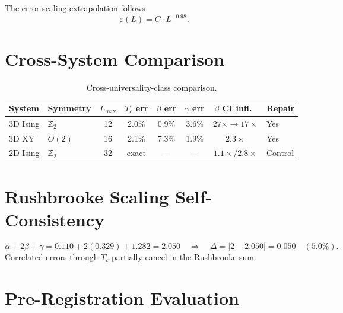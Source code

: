 \documentclass[11pt,a4paper]{article}
\begin{document}
The error scaling extrapolation follows
\begin{equation}\label{eq:error_scaling}
  \varepsilon(L) = C \cdot L^{-0.98}.
\end{equation}

\section{Cross-System Comparison}\label{sec:cross}

\begin{table}[ht]
\centering
\caption{Cross-universality-class comparison.}
\label{tab:cross}
\begin{tabular}{@{}llcccccl@{}}
\toprule
System & Symmetry & $L_{\max}$ & $T_c$ err & $\beta$ err & $\gamma$ err & $\beta$ CI infl.\ & Repair \\
\midrule
3D Ising & $\mathbb{Z}_2$ & 12 & 2.0\% & 0.9\% & 3.6\% & $27\times\to17\times$ & Yes \\
3D XY & $O(2)$ & 16 & 2.1\% & 7.3\% & 1.9\% & $2.3\times$ & Yes \\
2D Ising & $\mathbb{Z}_2$ & 32 & exact & --- & --- & $1.1\times / 2.8\times$ & Control \\
\bottomrule
\end{tabular}
\end{table}

\section{Rushbrooke Scaling Self-Consistency}\label{sec:rushbrooke}

\begin{equation}\label{eq:rushbrooke}
  \alpha + 2\beta + \gamma = 0.110 + 2(0.329) + 1.282 = 2.050 \quad\Rightarrow\quad \Delta = |2 - 2.050| = 0.050 \quad (5.0\%).
\end{equation}
Correlated errors through $T_c$ partially cancel in the Rushbrooke sum.

\section{Pre-Registration Evaluation}\label{sec:prereg_eval}
\end{document}
